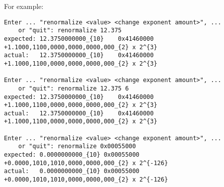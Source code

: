For example:

\begin{verbatim}
Enter ... "renormalize <value> <change exponent amount>", ...
    or "quit": renormalize 12.375
expected: 12.3750000000_{10}	0x41460000	+1.1000,1100,0000,0000,0000,000_{2} x 2^{3}
actual:   12.3750000000_{10}	0x41460000	+1.1000,1100,0000,0000,0000,000_{2} x 2^{3}

Enter ... "renormalize <value> <change exponent amount>", ...
    or "quit": renormalize 12.375 6
expected: 12.3750000000_{10}	0x41460000	+1.1000,1100,0000,0000,0000,000_{2} x 2^{3}
actual:   12.3750000000_{10}	0x41460000	+1.1000,1100,0000,0000,0000,000_{2} x 2^{3}

Enter ... "renormalize <value> <change exponent amount>", ...
    or "quit": renormalize 0x00055000
expected: 0.0000000000_{10}	0x00055000	+0.0000,1010,1010,0000,0000,000_{2} x 2^{-126}
actual:   0.0000000000_{10}	0x00055000	+0.0000,1010,1010,0000,0000,000_{2} x 2^{-126}
\end{verbatim}